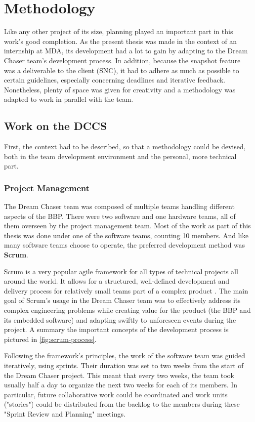 {
\setlength{\parindent}{2em}
\chapter{Methodology}\label{cha:meth}
Like any other project of its size, planning played an important part in this work's good completion. As the present thesis was made in the context of an internship at \gls{MDA}, its development had a lot to gain by adapting to the Dream Chaser team's development process. In addition, because the snapshot feature was a deliverable to the client (\gls{SNC}), it had to adhere as much as possible to certain guidelines, especially concerning deadlines and iterative feedback. Nonetheless, plenty of space was given for creativity and a methodology was adapted to work in parallel with the team. 

\section{Work on the DCCS}
First, the context had to be described, so that a methodology could be devised, both in the team development environment and the personal, more technical part.

\subsection*{Project Management}
The Dream Chaser team was composed of multiple teams handling different aspects of the \gls{BBP}. There were two software and one hardware teams, all of them overseen by the project management team. Most of the work as part of this thesis was done under one of the software teams, counting 10 members. And like many software teams choose to operate, the preferred development method was \textbf{Scrum}. 

Scrum is a very popular agile framework for all types of technical projects all around the world. It allows for a structured, well-defined development and delivery process for relatively small teams part of a complex product \cite{book:scrum}. The main goal of Scrum's usage in the Dream Chaser team was to effectively address its complex engineering problems while creating value for the product (the BBP and its embedded software) and adapting swiftly to unforeseen events during the project. A summary the important concepts of the development process is pictured in \autoref{fig:scrum-process}.

Following the framework's principles, the work of the software team was guided iteratively, using sprints. Their duration was set to two weeks from the start of the Dream Chaser project. This meant that every two weeks, the team took usually half a day to organize the next two weeks for each of its members. In particular, future collaborative work could be coordinated and work units ("stories") could be distributed from the backlog to the members during these "Sprint Review and Planning" meetings.

}
